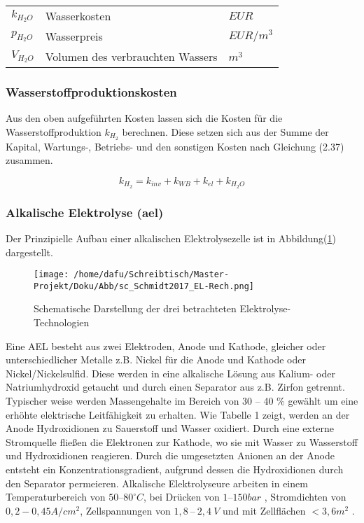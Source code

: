 \documentclass[onecolumn,10pt,titlepage]{article}
\begin{document}
				\begin{table}[H]
					\begin{tabular*}{\textwidth}{lll}
					$k_{H_2O}$&	Wasserkosten	&$EUR$\\
					$p_{H_2O}$&Wasserpreis		&$EUR/m^3$\\
					$V_{H_2O}$&Volumen des verbrauchten Wassers&$m^3$\\
				\end{tabular*}
			\end{table}
			
			\subsubsection*{Wasserstoffproduktionskosten}
			Aus den oben aufgeführten Kosten lassen sich die Kosten für die Wasserstoffproduktion $k_{H_2}$ berechnen. Diese setzen sich aus der Summe der Kapital, Wartungs-, Betriebs- und den sonstigen Kosten nach Gleichung (2.37) zusammen.
			
			\begin{equation}
			k_{H_2} = k_{inv}+k_{WB}+k_{el}+k_{H_2O}
			\end{equation}
			
			
			\subsubsection*{Alkalische Elektrolyse (\gls{ael})}	
			Der Prinzipielle Aufbau einer alkalischen Elektrolysezelle ist in Abbildung(\ref{fig:schem_EL}) dargestellt.
			
			\begin{figure}[H]	
				\centering
				\texttt{[image: /home/dafu/Schreibtisch/Master-Projekt/Doku/Abb/sc\_Schmidt2017\_EL-Rech.png]}
				\caption[Schematische Darstellung Elektrolyse-Technologien]{Schematische Darstellung der drei betrachteten Elektrolyse-Technologien}
				\label{fig:schem_EL}
			\end{figure}
			
			Eine AEL besteht aus zwei Elektroden, Anode und Kathode, gleicher oder unterschiedlicher Metalle z.B. Nickel für die Anode und Kathode oder Nickel/Nickelsulfid.\cite{Kurzweil.2015} Diese werden in eine alkalische Lösung aus Kalium- oder Natriumhydroxid getaucht und durch einen Separator aus z.B. Zirfon getrennt. Typischer weise werden Massengehalte im Bereich von 30 – 40 \% gewählt \cite{Ghaib.2017} um eine erhöhte elektrische Leitfähigkeit zu erhalten. Wie Tabelle 1 zeigt, werden an der Anode Hydroxidionen zu Sauerstoff und Wasser oxidiert. Durch eine externe Stromquelle fließen die Elektronen zur Kathode, wo sie mit Wasser zu Wasserstoff und Hydroxidionen reagieren. Durch die umgesetzten Anionen an der Anode entsteht ein Konzentrationsgradient, aufgrund dessen die Hydroxidionen durch den Separator permeieren.
			Alkalische Elektrolyseure arbeiten in einem Temperaturbereich von $50–80 ^\circ C$, bei Drücken von $1–150 bar$ , Stromdichten von $0,2 - 0,45 A/cm^2$, Zellspannungen von $1,8~–~2,4~ V$ \cite{Kurzweil.2015} und mit Zellflächen $< 3,6 m^2$\cite{Buttler.2018} . 
			
\end{document}
